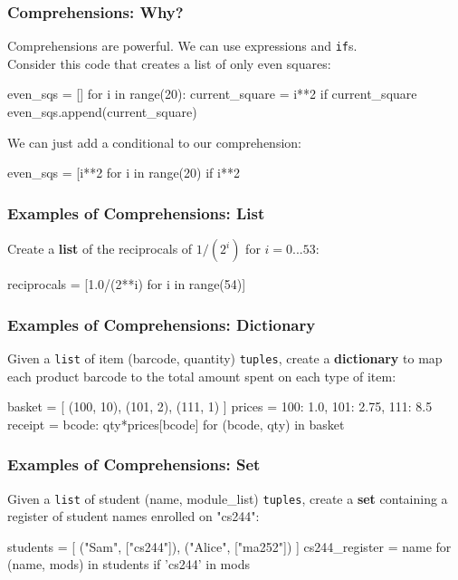 \documentclass{beamer}
\begin{document}
\begin{frame}[fragile]
\frametitle{Comprehensions: Why?}

Comprehensions are powerful. We can use expressions and \texttt{if}s.\\
Consider this code that creates a list of only even squares:
\begin{code}
even_sqs = []
for i in range(20):
    current_square = i**2
    if current_square %
        even_sqs.append(current_square)
\end{code}

\vskip 0.3cm
We can just add a conditional to our comprehension:
\begin{code}
even_sqs = [i**2 for i in range(20) if i**2 %
\end{code}
\end{frame}


\begin{frame}[fragile]
\frametitle{Examples of Comprehensions: List}
Create a \textbf{list} of the reciprocals of $1/(2^i)$ for $i=0...53$:
\begin{code}
reciprocals = [1.0/(2**i) for i in range(54)]
\end{code}
\end{frame}

\begin{frame}[fragile]
\frametitle{Examples of Comprehensions: Dictionary}
Given a \texttt{list} of item (barcode, quantity) \texttt{tuples},
create a \textbf{dictionary} to map each product
barcode to the total amount spent on each type of item:
\begin{code}
basket = [
    (100, 10),
    (101, 2),
    (111, 1)
]
prices = {
    100: 1.0,
    101: 2.75,
    111: 8.5
}
receipt = {
    bcode: qty*prices[bcode] for (bcode, qty) in basket}
\end{code}
\end{frame}

\begin{frame}[fragile]
\frametitle{Examples of Comprehensions: Set}
Given a \texttt{list} of student (name, module\_list) \texttt{tuples},
create a \textbf{set} containing a register of student names enrolled on "cs244":
\begin{code}
students = [
    ("Sam", ["cs244"]), 
    ("Alice", ["ma252"])
]
cs244_register = {
    name for (name, mods) in students if 'cs244' in mods}
\end{code}
\end{frame}
\end{document}
